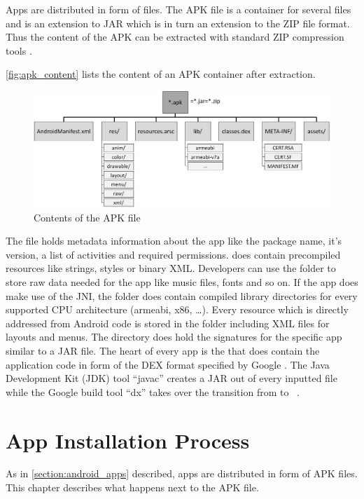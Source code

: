 Apps are distributed in form of  files.
The APK file is a container for several files and is an extension to
JAR which is in turn an extension to the ZIP file format.
Thus the content of the APK can be extracted with standard ZIP
compression tools \parencite{securityinternals}.

\autoref{fig:apk_content} lists the content of an APK container
after extraction.
\begin{figure}[htb]
  \includegraphics[width=\textwidth]{figures/apk_content}
  \caption[APK Content]{Contents of the APK file}
  \label{fig:apk_content}
\end{figure}
The  file holds metadata information
about the app like the package name, it's version, a list of
activities and required permissions. 
does contain precompiled resources like strings, styles
or binary XML. Developers can use the  folder
to store raw data needed for the app like music files,
fonts and so on. If the app does make use of the JNI,
the  folder does contain compiled library directories
for every supported CPU architecture (armeabi, x86, \ldots).
Every resource which is directly addressed from Android code
is stored in the  folder including XML files for
layouts and menus. The  directory does hold
the signatures for the specific app similar to a JAR file.
The heart of every app is the  that does
contain the application code in form of the DEX format
specified by Google \parencite{dex}. The Java Development
Kit (JDK) tool ``javac'' creates a JAR out of every inputted
  file while the Google build tool ``dx'' takes over
 the transition from  to  ~\parencite{dxtool}.

\section{App Installation Process}\label{section:app_installation}
As in \autoref{section:android_apps} described, apps are distributed
in form of APK files. This chapter describes what happens next to
the APK file.

